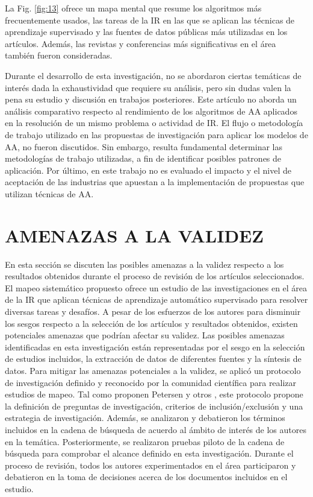 \documentclass[journal]{IEEEtran}
\begin{document}
La Fig. \ref{fig:13} ofrece un mapa mental que resume los algoritmos más frecuentemente usados, las tareas de la IR en las que se aplican las técnicas de aprendizaje supervisado y las fuentes de datos públicas más utilizadas en los artículos. Además, las revistas y conferencias más significativas en el área también fueron consideradas. 

Durante el desarrollo de esta investigación, no se abordaron ciertas temáticas de interés dada la exhaustividad que requiere su análisis, pero sin dudas valen la pena su estudio y discusión en trabajos posteriores. Este artículo no aborda un análisis comparativo respecto al rendimiento de los algoritmos de AA aplicados en la resolución de un mismo problema o actividad de IR. El flujo o metodología de trabajo utilizado en las propuestas de investigación para aplicar los modelos de AA, no fueron discutidos. Sin embargo, resulta fundamental determinar las metodologías de trabajo utilizadas, a fin de identificar posibles patrones de aplicación.  Por último, en este trabajo no es evaluado el impacto y el nivel de aceptación de las industrias que apuestan a la implementación de propuestas que utilizan técnicas de AA. 

\section{AMENAZAS A LA VALIDEZ}

En esta sección se discuten las posibles amenazas a la validez respecto a los resultados obtenidos durante el proceso de revisión de los artículos seleccionados. El mapeo sistemático propuesto ofrece un estudio de las investigaciones en el área de la IR que aplican técnicas de aprendizaje automático supervisado para resolver diversas tareas y desafíos. A pesar de los esfuerzos de los autores para disminuir los sesgos respecto a la selección de los artículos y resultados obtenidos, existen potenciales amenazas que podrían afectar su validez. Las posibles amenazas identificadas en esta investigación están representadas por el sesgo en la selección de estudios incluidos, la extracción de datos de diferentes fuentes y la síntesis de datos. Para mitigar las amenazas potenciales a la validez, se aplicó un protocolo de investigación definido y reconocido por la comunidad científica para realizar estudios de mapeo. Tal como proponen Petersen y otros \cite{petersen2008systematic}, este protocolo propone la definición de preguntas de investigación, criterios de inclusión/exclusión y una estrategia de investigación. Además, se analizaron y debatieron los términos incluidos en la cadena de búsqueda de acuerdo al ámbito de interés de los autores en la temática. Posteriormente, se realizaron pruebas piloto de la cadena de búsqueda para comprobar el alcance definido en esta investigación. Durante el proceso de revisión, todos los autores experimentados en el área participaron y debatieron en  la toma de decisiones acerca de los documentos incluidos en el estudio.
\end{document}
